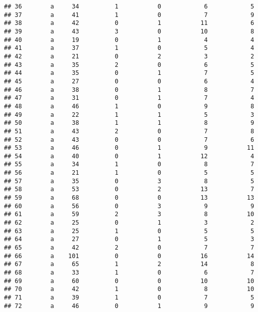 \documentclass[
]{article}
\begin{document}
\begin{verbatim}
## 36        a     34          1           0            6            5
## 37        a     41          1           0            7            9
## 38        a     42          0           1           11            6
## 39        a     43          3           0           10            8
## 40        a     19          0           1            4            4
## 41        a     37          1           0            5            4
## 42        a     21          0           2            3            2
## 43        a     35          2           0            6            5
## 44        a     35          0           1            7            5
## 45        a     27          0           0            6            4
## 46        a     38          0           1            8            7
## 47        a     31          0           1            7            4
## 48        a     46          1           0            9            8
## 49        a     22          1           1            5            3
## 50        a     38          1           1            8            9
## 51        a     43          2           0            7            8
## 52        a     43          0           0            7            6
## 53        a     46          0           1            9           11
## 54        a     40          0           1           12            4
## 55        a     34          1           0            8            7
## 56        a     21          1           0            5            5
## 57        a     35          0           3            8            5
## 58        a     53          0           2           13            7
## 59        a     68          0           0           13           13
## 60        a     56          0           3            9            9
## 61        a     59          2           3            8           10
## 62        a     25          0           1            3            2
## 63        a     25          1           0            5            5
## 64        a     27          0           1            5            3
## 65        a     42          2           0            7            7
## 66        a    101          0           0           16           14
## 67        a     65          1           2           14            8
## 68        a     33          1           0            6            7
## 69        a     60          0           0           10           10
## 70        a     42          1           0            8           10
## 71        a     39          1           0            7            5
## 72        a     46          0           1            9            9

\end{verbatim}
\end{document}
